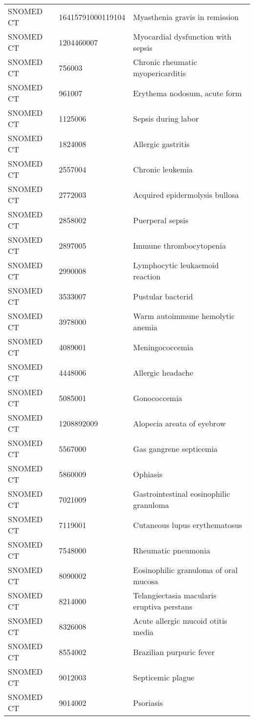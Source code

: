 \begin{longtable}{p{}p{}p{}}
  SNOMED CT & 16415791000119104 & Myasthenia gravis in remission \\ 
  SNOMED CT & 1204460007 & Myocardial dysfunction with sepsis \\ 
  SNOMED CT & 756003 & Chronic rheumatic myopericarditis \\ 
  SNOMED CT & 961007 & Erythema nodosum, acute form \\ 
  SNOMED CT & 1125006 & Sepsis during labor \\ 
  SNOMED CT & 1824008 & Allergic gastritis \\ 
  SNOMED CT & 2557004 & Chronic leukemia \\ 
  SNOMED CT & 2772003 & Acquired epidermolysis bullosa \\ 
  SNOMED CT & 2858002 & Puerperal sepsis \\ 
  SNOMED CT & 2897005 & Immune thrombocytopenia \\ 
  SNOMED CT & 2990008 & Lymphocytic leukaemoid reaction \\ 
  SNOMED CT & 3533007 & Pustular bacterid \\ 
  SNOMED CT & 3978000 & Warm autoimmune hemolytic anemia \\ 
  SNOMED CT & 4089001 & Meningococcemia \\ 
  SNOMED CT & 4448006 & Allergic headache \\ 
  SNOMED CT & 5085001 & Gonococcemia \\ 
  SNOMED CT & 1208892009 & Alopecia areata of eyebrow \\ 
  SNOMED CT & 5567000 & Gas gangrene septicemia \\ 
  SNOMED CT & 5860009 & Ophiasis \\ 
  SNOMED CT & 7021009 & Gastrointestinal eosinophilic granuloma \\ 
  SNOMED CT & 7119001 & Cutaneous lupus erythematosus \\ 
  SNOMED CT & 7548000 & Rheumatic pneumonia \\ 
  SNOMED CT & 8090002 & Eosinophilic granuloma of oral mucosa \\ 
  SNOMED CT & 8214000 & Telangiectasia macularis eruptiva perstans \\ 
  SNOMED CT & 8326008 & Acute allergic mucoid otitis media \\ 
  SNOMED CT & 8554002 & Brazilian purpuric fever \\ 
  SNOMED CT & 9012003 & Septicemic plague \\ 
  SNOMED CT & 9014002 & Psoriasis \\ 

\end{longtable}
